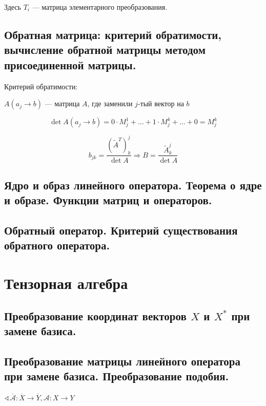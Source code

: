 
Здесь $T_i$ --- матрица элементарного преобразования.

\subsection{Обратная матрица: критерий обратимости, вычисление обратной матрицы методом присоединенной матрицы.}

Критерий обратимости: 


$A(a_j \to b)$ --- матрица $A$, где заменили $j$-тый вектор на $b$

$$\det A(a_j\to b) = 0 \cdot M_j^1 + \ldots + 1 \cdot M_j^k + \ldots + 0 = M^k_j$$

$$b_{jk} = \frac{(\tilde A^T)^j_k}{\det A} \Rightarrow B = \frac{\tilde A_k^j}{\det A}$$

\subsection{Ядро и образ линейного оператора. Теорема о ядре и образе. Функции матриц и операторов.}

\subsection{Обратный оператор. Критерий существования обратного оператора.}

\section{Тензорная алгебра}

\subsection{Преобразование координат векторов $X$ и $X^*$ при замене базиса.}

\subsection{Преобразование матрицы линейного оператора при замене базиса. Преобразование подобия.}
$\sphericalangle \overline{\mathcal A} : \overline X \to \overline Y, \mathcal A : X \to Y$

